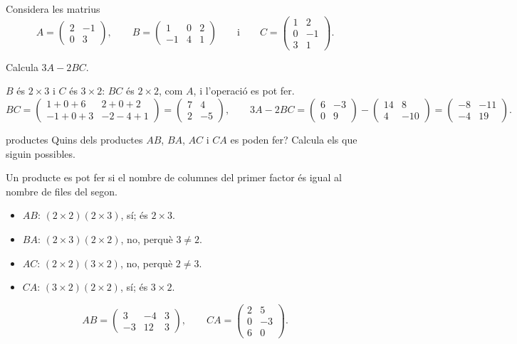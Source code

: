 Considera les matrius
\[
A=\begin{pmatrix}2&-1\\0&3\end{pmatrix},\qquad
B=\begin{pmatrix}1&0&2\\-1&4&1\end{pmatrix}\qquad\text{i}\qquad
C=\begin{pmatrix}1&2\\0&-1\\3&1\end{pmatrix}.
\]

\begin{apartats}

Calcula $3A-2BC$.

\begin{solucio}
$B$ és $2\times3$ i $C$ és $3\times2$: $BC$ és $2\times2$, com $A$, i l'operació es pot fer.
\[
BC=\begin{pmatrix}1+0+6&2+0+2\\-1+0+3&-2-4+1\end{pmatrix}=\begin{pmatrix}7&4\\2&-5\end{pmatrix},\qquad
3A-2BC=\begin{pmatrix}6&-3\\0&9\end{pmatrix}-\begin{pmatrix}14&8\\4&-10\end{pmatrix}
=\begin{pmatrix}-8&-11\\-4&19\end{pmatrix}.
\]
\end{solucio}

\begin{tria}{productes}
Quins dels productes $AB$, $BA$, $AC$ i $CA$ es poden fer? Calcula els que siguin possibles.

\begin{solucio}
Un producte es pot fer si el nombre de columnes del primer factor és igual al nombre de files del segon.
\begin{itemize}
\item $AB$: $(2\times2)(2\times3)$, sí; és $2\times3$.
\item $BA$: $(2\times3)(2\times2)$, no, perquè $3\ne2$.
\item $AC$: $(2\times2)(3\times2)$, no, perquè $2\ne3$.
\item $CA$: $(3\times2)(2\times2)$, sí; és $3\times2$.
\end{itemize}
\[
AB=\begin{pmatrix}3&-4&3\\-3&12&3\end{pmatrix},\qquad
CA=\begin{pmatrix}2&5\\0&-3\\6&0\end{pmatrix}.
\]
\end{solucio}


\end{tria}
\end{apartats}
